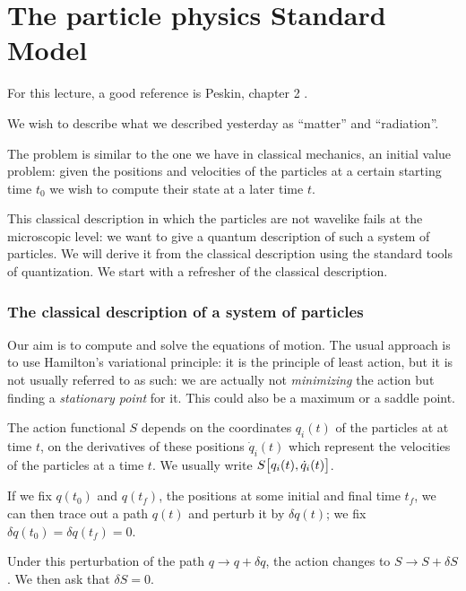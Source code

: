 \documentclass[main.tex]{subfiles}
\begin{document}
\chapter{The particle physics Standard Model}


For this lecture, a good reference is Peskin, chapter 2 \cite{peskinConceptsElementaryParticle2019}.

We wish to describe what we described yesterday as ``matter'' and ``radiation''.

The problem is similar to the one we have in classical mechanics, an initial value problem: given the positions and velocities of the particles at a certain starting time \(t_0 \) we wish to compute their state at a later time \(t\).

This classical description in which the particles are not wavelike fails at the microscopic level: we want to give a quantum description of such a system of particles. 
We will derive it from the classical description using the standard tools of quantization. 
We start with a refresher of the classical description.

\subsection{The classical description of a system of particles}

Our aim is to compute and solve the equations of motion.
The usual approach is to use Hamilton's variational principle: it is the principle of least action, but it is not usually referred to as such: we are actually not \emph{minimizing} the action but finding a \emph{stationary point} for it.
This could also be a maximum or a saddle point.

The action functional \(S\) depends on the coordinates \(q_i(t)\) of the particles at at time \(t\), on the derivatives of these positions \(\dot{q}_{i}(t)\) which represent the velocities of the particles at a time \(t\). 
We usually write \(S \qty[q_{i}(t), \dot{q}_{i}(t)]\). 

If we fix \(q(t_0 )\) and \(q(t_{f})\), the positions at some initial and final time \(t_f\), we can then trace out a path \(q(t)\) and perturb it by \(\delta q(t)\); we fix \(\delta q(t_0 ) = \delta q(t_f) = 0\). 

Under this perturbation of the path \(q \rightarrow q + \delta q\), the action changes to \(S \rightarrow S + \delta S\). 
We then ask that \(\delta S =0\). 
\end{document}

